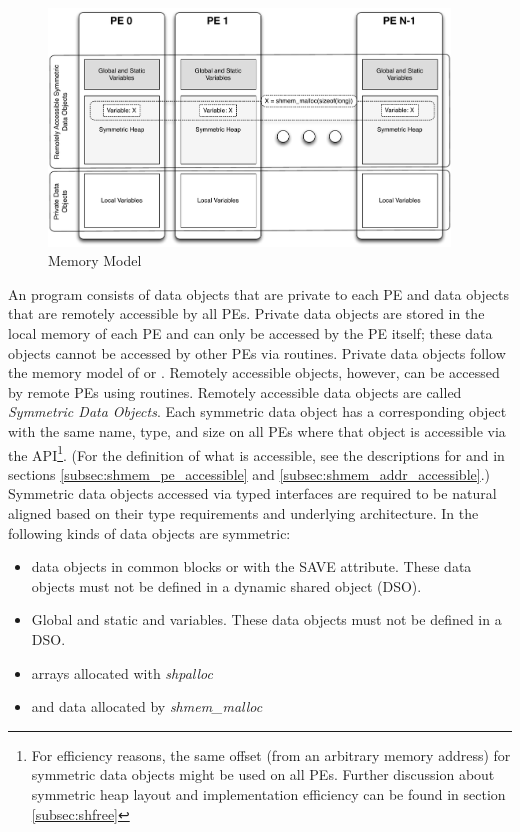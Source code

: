 \begin{figure}[h]
\includegraphics[width=0.95\textwidth]{figures/mem_model}      
\caption{\openshmem Memory Model}
\label{fig:mem_model}                                               
\end{figure}      
%
An \openshmem program consists of data objects that are private to each \ac{PE}
and data  objects that are remotely accessible by all \ac{PE}s. Private data
objects are stored in the local memory of each \ac{PE} and can only be accessed
by the \ac{PE} itself; these data objects cannot be accessed by other \ac{PE}s
via \openshmem routines. Private data objects follow the memory model of
\Clang{} or \Fortran. Remotely accessible objects, however, can be accessed by
remote \ac{PE}s using \openshmem routines.  Remotely accessible data objects are
called \emph{Symmetric Data Objects}.  Each symmetric data object has a
corresponding object with the same name, type, and size on all PEs where that object is
accessible via the \openshmem \ac{API}\footnote{For efficiency reasons,
the same offset (from an arbitrary memory address) for symmetric data
objects might be used on all \acp{PE}. Further discussion about symmetric heap
layout and implementation efficiency can be found in section
\ref{subsec:shfree}}.  (For the definition of what is accessible, see the
descriptions for  and 
in sections \ref{subsec:shmem_pe_accessible} and
\ref{subsec:shmem_addr_accessible}.) Symmetric data objects accessed via typed
\openshmem interfaces are required to be natural aligned based on their type
requirements and underlying architecture.  In \openshmem the following kinds of
data objects are symmetric:
%
\begin{itemize}
  \item \Fortran{} data objects in common blocks or with the  SAVE  attribute.
      These data objects must not be defined in a dynamic shared object (DSO).
  \item Global and static \Clang{} and \Cpp variables. These data objects must
      not  be defined in a DSO.
  \item \Fortran{} arrays allocated with \textit{shpalloc} 
  \item \Clang{} and \Cpp data allocated by \textit{shmem\_malloc}
\end{itemize}       

